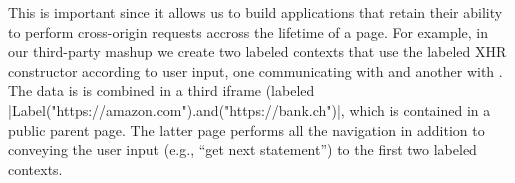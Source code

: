 This is important since it allows us to build applications that retain
their ability to perform cross-origin requests accross the lifetime of
a page.
%
For example, in our third-party mashup we create two labeled contexts
that use the labeled XHR constructor according to user input, one
communicating with  and another with
.
%
The data is is combined in a third iframe (labeled
\js|Label("https://amazon.com").and("https://bank.ch")|, which is
contained in a public parent page.
%
The latter page performs all the navigation in addition to conveying
the user input (e.g., ``get next statement'') to the first two
labeled contexts.





